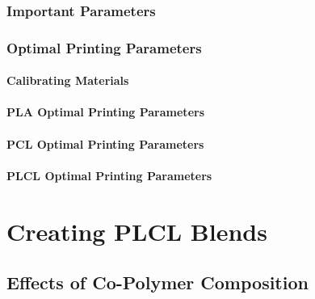 \subsubsection{Important Parameters\label{sec:literatureReview:printing:FDM:parameters}}

\subsubsection{Optimal Printing Parameters\label{sec:literatureReview:printing:FDM:optimalParameters}}

\paragraph*{Calibrating Materials}

\paragraph*{PLA Optimal Printing Parameters}

\paragraph*{PCL Optimal Printing Parameters}

\paragraph*{PLCL Optimal Printing Parameters}

\section{Creating PLCL Blends\label{sec:literatureReview:PLCL}}

\subsection{Effects of Co-Polymer Composition\label{sec:literatureReview:PLCL:composition}}

